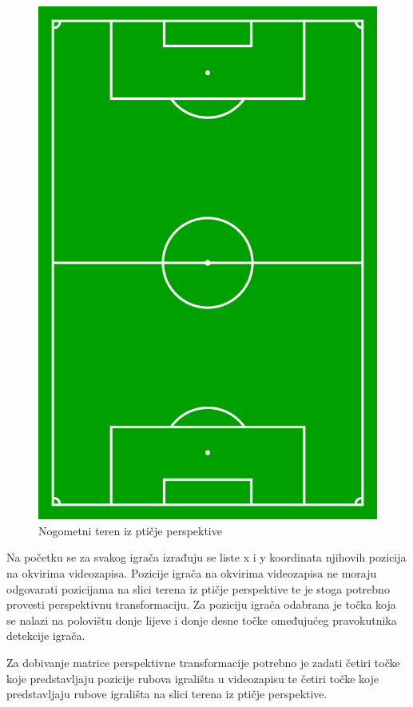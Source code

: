 \documentclass[times, utf8, seminar, numeric]{fer}
\begin{document}
\begin{figure}
	\centering
	\includegraphics[scale=0.15]{slike/pitch.png}
	\caption {Nogometni teren iz ptičje perspektive}
	\label{fig:pitch}	
\end{figure}

Na početku se za svakog igrača izrađuju se liste x i y koordinata njihovih pozicija na okvirima videozapisa. Pozicije igrača na okvirima videozapisa ne moraju odgovarati pozicijama na slici terena iz ptičje perspektive te je stoga potrebno provesti perspektivnu transformaciju. Za poziciju igrača odabrana je točka koja se nalazi na polovištu donje lijeve i donje desne točke omeđujućeg pravokutnika detekcije igrača.
 
Za dobivanje matrice perspektivne transformacije potrebno je zadati četiri točke koje predstavljaju pozicije rubova igrališta u videozapisu te četiri točke koje predstavljaju rubove igrališta na slici terena iz ptičje perspektive. 
\end{document}
